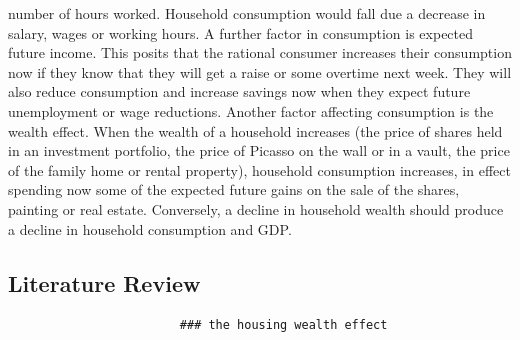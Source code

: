 \documentclass[12pt,a4paper,]{article}
\begin{document}
number of hours worked. Household consumption would fall due a decrease
in salary, wages or working hours. A further factor in consumption is
expected future income. This posits that the rational consumer increases
their consumption now if they know that they will get a raise or some
overtime next week. They will also reduce consumption and increase
savings now when they expect future unemployment or wage reductions.
Another factor affecting consumption is the wealth effect. When the
wealth of a household increases (the price of shares held in an
investment portfolio, the price of Picasso on the wall or in a vault,
the price of the family home or rental property), household consumption
increases, in effect spending now some of the expected future gains on
the sale of the shares, painting or real estate. Conversely, a decline
in household wealth should produce a decline in household consumption
and GDP.

\subsection{Literature Review}\label{literature-review}

\begin{verbatim}
                        ### the housing wealth effect
                            
\end{verbatim}
\end{document}
